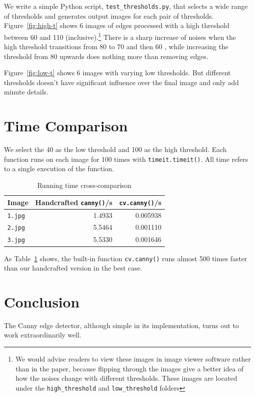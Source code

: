 \documentclass{ee208report}
\begin{document}
\begin{multicols*}{2}
We write a simple Python script, \texttt{test\_thresholds.py}, that selects a
wide range of thresholds and generates output images for each pair of
thresholds. Figure~\ref{fig:high-t} shows 6 images of edges processed with a
high threshold between 60 and 110 (inclusive).\footnote{We would advise readers
to view these images in image viewer software rather than in the paper, because
flipping through the images give a better idea of how the noises change with
different thresholds. These images are located under the
\texttt{high\_threshold} and \texttt{low\_threshold} folders} There is a sharp
increase of noises when the high threshold transitions from 80 to 70 and then 60
, while increasing the threshold from 80 upwards does nothing more than removing
edges.

Figure~\ref{fig:low-t} shows 6 images with varying low thresholds. But different
thresholds doesn't have significant influence over the final image and only add
minute details.

\section{Time Comparison}

We select the 40 as the low threshold and 100 as the high threshold. Each
function runs on each image for 100 times with \texttt{timeit.timeit()}.
All time refers to a single execution of the function.

\begin{table}[H]
\begin{tabular}{lrr}
    \toprule
    Image & Handcrafted \texttt{canny()}/s & \texttt{cv.canny()}/s \\
    \midrule
    \texttt{1.jpg} & 1.4933 & 0.005938 \\
    \texttt{2.jpg} & 5.5464 & 0.001110 \\
    \texttt{3.jpg} & 5.5330 & 0.001646 \\
    \bottomrule
\end{tabular}
\caption{Running time cross-comparison}
\label{tbl:time}
\end{table}

As Table~\ref{tbl:time} shows, the built-in function \texttt{cv.canny()} runs
almost 500 times faster than our handcrafted version in the best case.

\section{Conclusion}

The Canny edge detector, although simple in its implementation, turns out to
work extraordinarily well.

\end{multicols*}
\end{document}

